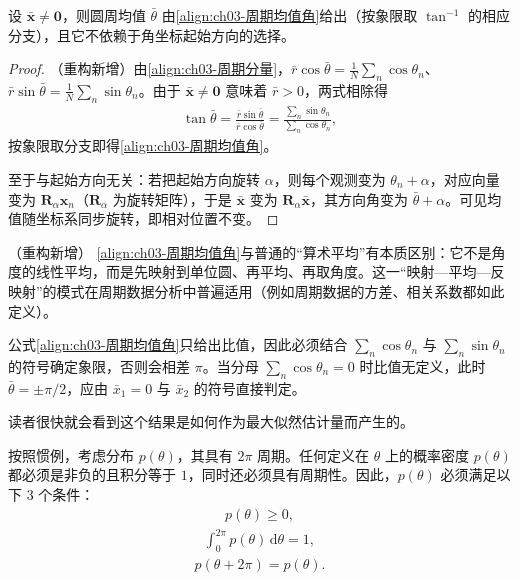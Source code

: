 \documentclass[../../main.tex]{subfiles}
\begin{document}
\begin{proposition}[圆周均值的显式表达]\label{proposition:ch03-圆周均值公式}
设 $\bar{\boldsymbol{x}}\neq\boldsymbol{0}$，则圆周均值 $\bar{\theta}$ 由\eqref{align:ch03-周期均值角}给出（按象限取 $\tan^{-1}$ 的相应分支），且它不依赖于角坐标起始方向的选择。
\end{proposition}
\begin{proof}
（重构新增）由\eqref{align:ch03-周期分量}，$\bar{r}\cos\bar{\theta}=\frac1N\sum_n\cos\theta_n$、$\bar{r}\sin\bar{\theta}=\frac1N\sum_n\sin\theta_n$。由于 $\bar{\boldsymbol{x}}\neq\boldsymbol{0}$ 意味着 $\bar{r}>0$，两式相除得
\begin{align*}
\tan\bar{\theta}=\frac{\bar{r}\sin\bar{\theta}}{\bar{r}\cos\bar{\theta}}=\frac{\sum_n\sin\theta_n}{\sum_n\cos\theta_n},
\end{align*}
按象限取分支即得\eqref{align:ch03-周期均值角}。

至于与起始方向无关：若把起始方向旋转 $\alpha$，则每个观测变为 $\theta_n+\alpha$，对应向量变为 $\boldsymbol{R}_\alpha\boldsymbol{x}_n$（$\boldsymbol{R}_\alpha$ 为旋转矩阵），于是 $\bar{\boldsymbol{x}}$ 变为 $\boldsymbol{R}_\alpha\bar{\boldsymbol{x}}$，其方向角变为 $\bar{\theta}+\alpha$。可见均值随坐标系同步旋转，即相对位置不变。
\end{proof}

\begin{remark}（重构新增）
\eqref{align:ch03-周期均值角}与普通的“算术平均”有本质区别：它不是角度的线性平均，而是先映射到单位圆、再平均、再取角度。这一“映射—平均—反映射”的模式在周期数据分析中普遍适用（例如周期数据的方差、相关系数都如此定义）。

公式\eqref{align:ch03-周期均值角}只给出比值，因此必须结合 $\sum_n\cos\theta_n$ 与 $\sum_n\sin\theta_n$ 的符号确定象限，否则会相差 $\pi$。当分母 $\sum_n\cos\theta_n=0$ 时比值无定义，此时 $\bar{\theta}=\pm\pi/2$，应由 $\bar{x}_1=0$ 与 $\bar{x}_2$ 的符号直接判定。
\end{remark}

读者很快就会看到这个结果是如何作为最大似然估计量而产生的。

按照惯例，考虑分布 $p(\theta)$，其具有 $2\pi$ 周期。任何定义在 $\theta$ 上的概率密度 $p(\theta)$ 都必须是非负的且积分等于 $1$，同时还必须具有周期性。因此，$p(\theta)$ 必须满足以下 3 个条件：
\begin{align}
p(\theta)\geqslant0,
\label{align:ch03-周期分布非负}
\end{align}
\begin{align}
\int_{0}^{2\pi}p(\theta)\,\mathrm{d}\theta=1,
\label{align:ch03-周期分布归一}
\end{align}
\begin{align}
p(\theta+2\pi)=p(\theta).
\label{align:ch03-周期分布周期}
\end{align}
\end{document}
